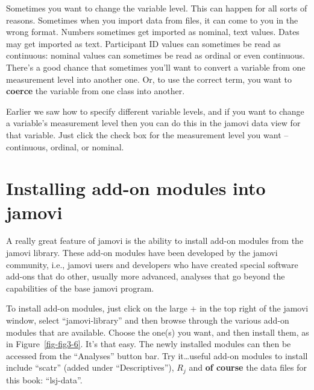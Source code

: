 \documentclass[
  a4paper,
]{book}
\begin{document}
Sometimes you want to change the variable level. This can happen for all
sorts of reasons. Sometimes when you import data from files, it can come
to you in the wrong format. Numbers sometimes get imported as nominal,
text values. Dates may get imported as text. Participant ID values can
sometimes be read as continuous: nominal values can sometimes be read as
ordinal or even continuous. There's a good chance that sometimes you'll
want to convert a variable from one measurement level into another one.
Or, to use the correct term, you want to \textbf{coerce} the variable
from one class into another.

Earlier we saw how to specify different variable levels, and if you want
to change a variable's measurement level then you can do this in the
jamovi data view for that variable. Just click the check box for the
measurement level you want -- continuous, ordinal, or nominal.

\hypertarget{installing-add-on-modules-into-jamovi}{%
\section{Installing add-on modules into
jamovi}\label{installing-add-on-modules-into-jamovi}}

A really great feature of jamovi is the ability to install add-on
modules from the jamovi library. These add-on modules have been
developed by the jamovi community, i.e., jamovi users and developers who
have created special software add-ons that do other, usually more
advanced, analyses that go beyond the capabilities of the base jamovi
program.

To install add-on modules, just click on the large \(+\) in the top
right of the jamovi window, select ``jamovi-library'' and then browse
through the various add-on modules that are available. Choose the one(s)
you want, and then install them, as in Figure~\ref{fig-fig3-6}. It's
that easy. The newly installed modules can then be accessed from the
``Analyses'' button bar. Try it\ldots useful add-on modules to install
include ``scatr'' (added under ``Descriptives''), \(R_j\) and \textbf{of
course} the data files for this book: ``lsj-data''.
\end{document}
